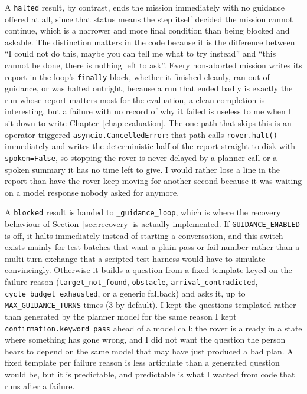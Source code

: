 A \texttt{halted} result, by contrast, ends the mission immediately with no
guidance offered at all, since that status means the step itself decided
the mission cannot continue, which is a narrower and more final condition
than being blocked and askable. The distinction matters in the code because
it is the difference between ``I could not do this, maybe you can tell me
what to try instead'' and ``this cannot be done, there is nothing left to
ask''. Every non-aborted mission writes its report in the loop's
\texttt{finally} block, whether it finished cleanly, ran out of guidance,
or was halted outright, because a run that ended badly is exactly the run
whose report matters most for the evaluation, a clean completion is
interesting, but a failure with no record of why it failed is useless to
me when I sit down to write Chapter~\ref{chap:evaluation}. The one path
that skips this is an operator-triggered \texttt{asyncio.CancelledError}:
that path calls \texttt{rover.halt()} immediately and writes the
deterministic half of the report straight to disk with
\texttt{spoken=False}, so stopping the rover is never delayed by a planner
call or a spoken summary it has no time left to give. I would rather lose
a line in the report than have the rover keep moving for another second
because it was waiting on a model response nobody asked for anymore.

\label{ssec:guidance_loop}

A \texttt{blocked} result is handed to \texttt{\_guidance\_loop}, which is
where the recovery behaviour of Section~\ref{sec:recovery} is actually
implemented. If \texttt{GUIDANCE\_ENABLED} is off, it halts immediately
instead of starting a conversation, and this switch exists mainly for test
batches that want a plain pass or fail number rather than a multi-turn
exchange that a scripted test harness would have to simulate convincingly.
Otherwise it builds a question from a fixed template keyed on the failure
reason (\texttt{target\_not\_found}, \texttt{obstacle},
\texttt{arrival\_contradicted}, \texttt{cycle\_budget\_exhausted}, or a
generic fallback) and asks it, up to \texttt{MAX\_GUIDANCE\_TURNS} times
(3 by default). I kept the questions templated rather than generated by the
planner model for the same reason I kept \texttt{confirmation.keyword\_pass}
ahead of a model call: the rover is already in a state where something has
gone wrong, and I did not want the question the person hears to depend on
the same model that may have just produced a bad plan. A fixed template per
failure reason is less articulate than a generated question would be, but
it is predictable, and predictable is what I wanted from code that runs
after a failure.

